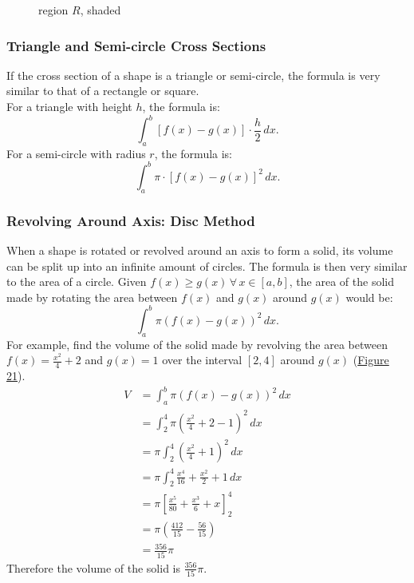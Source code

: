 \documentclass[12pt]{article}
\begin{document}
\begin{figure}[H]
    \begin{center}
        \caption{region $R$, shaded}
        \label{fig:srcross}
    \end{center}
\end{figure}

\subsubsection{Triangle and Semi-circle Cross Sections}
If the cross section of a shape is a triangle or semi-circle, the formula is very similar to that of a rectangle or square.
\\ For a triangle with height $h$, the formula is:
\[ \int_a^b \left[ f(x) - g(x) \right] \cdot \frac{h}{2} \, dx. \]
For a semi-circle with radius $r$, the formula is:
\[ \int_a^b \pi \cdot \left[ f(x) - g(x) \right]^2 \, dx. \]

\subsubsection{Revolving Around Axis: Disc Method}
When a shape is rotated or revolved around an axis to form a solid, its volume can be split up into an infinite amount of circles. The formula is then very similar to the area of a circle. Given $f(x) \ge g(x) \, \forall \, x \in [a, b]$, the area of the solid made by rotating the area between $f(x)$ and $g(x)$ around $g(x)$ would be:
\[ \int_a^b \pi \left( f(x) - g(x) \right)^2 \, dx. \]
For example, find the volume of the solid made by revolving the area between $f(x) = \frac{x^2}{4} + 2$ and $g(x) = 1$ over the interval $[2, 4]$ around $g(x)$ (\hyperref[fig:disc]{Figure 21}).
\begin{align*}
    V & = \int_a^b \pi \left( f(x) - g(x) \right)^2 \, dx           \\
      & = \int_2^4 \pi \left( \frac{x^2}{4} + 2 - 1 \right)^2 \, dx \\[6pt]
      & = \pi \int_2^4 \left( \frac{x^2}{4} + 1 \right)^2 \, dx     \\[6pt]
      & = \pi \int_2^4 \frac{x^4}{16} + \frac{x^2}{2} + 1 \, dx     \\[6pt]
      & = \pi \left[ \frac{x^5}{80} + \frac{x^3}{6} + x \right]_2^4 \\[6pt]
      & = \pi \left( \frac{412}{15} - \frac{56}{15} \right)         \\[6pt]
      & = \frac{356}{15} \pi
\end{align*}
Therefore the volume of the solid is $\frac{356}{15} \pi$.
\end{document}
